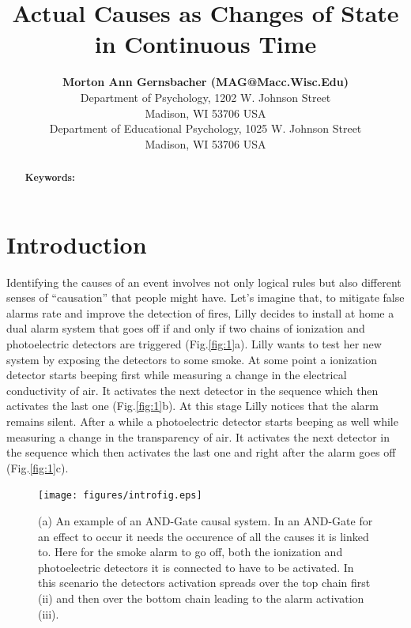 \documentclass[10pt,letterpaper]{article}
\title{Actual Causes as Changes of State in Continuous Time}
\author{{\large \bf Morton Ann Gernsbacher (MAG@Macc.Wisc.Edu)} \\
  Department of Psychology, 1202 W. Johnson Street \\
  Madison, WI 53706 USA
  \AND {\large \bf Sharon J.~Derry (SDJ@Macc.Wisc.Edu)} \\
  Department of Educational Psychology, 1025 W. Johnson Street \\
  Madison, WI 53706 USA}
\begin{document}
\maketitle


\begin{abstract}

\textbf{Keywords:} 
\end{abstract}


\section{Introduction}

Identifying the causes of an event involves not only logical rules but also different senses of ``causation'' that people might have. Let's imagine that, to mitigate false alarms rate and improve the detection of fires, Lilly decides to install at home a dual alarm system that goes off if and only if two chains of ionization and photoelectric detectors are triggered (Fig.\ref{fig:1}a). Lilly wants to test her new system by exposing the detectors to some smoke. At some point a ionization detector starts beeping first while measuring a change in the electrical conductivity of air. It activates the next detector in the sequence which then activates the last one (Fig.\ref{fig:1}b). At this stage Lilly notices that the alarm remains silent. After a while a photoelectric detector starts beeping as well while measuring a change in the transparency of air. It activates the next detector in the sequence which then activates the last one and right after the alarm goes off (Fig.\ref{fig:1}c). 

\begin{figure}[h]
\begin{center}
\texttt{[image: figures/introfig.eps]}
\end{center}
\caption{(a) An example of an AND-Gate causal system. In an AND-Gate for an effect to occur it needs the occurence of all the causes it is linked to. Here for the smoke alarm to go off, both the ionization and photoelectric detectors it is connected to have to be activated. In this scenario the detectors activation spreads over the top chain first (ii) and then over the bottom chain leading to the alarm activation (iii).} 
\label{fig:intro}
\end{figure}
\end{document}

